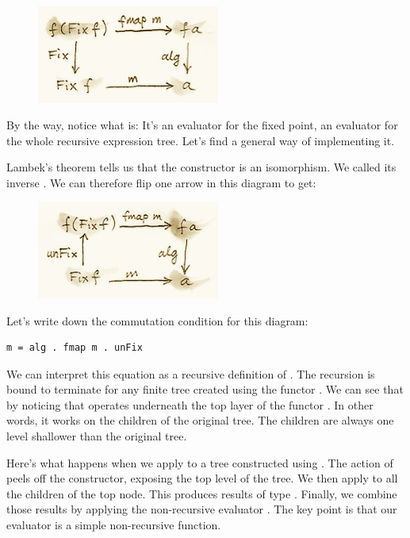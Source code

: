 \begin{figure}[H]
\centering
\includegraphics[width=60mm]{images/alg5.png}
\end{figure}

\noindent
By the way, notice what  is: It's an evaluator for the fixed
point, an evaluator for the whole recursive expression tree. Let's find
a general way of implementing it.

Lambek's theorem tells us that the constructor  is an
isomorphism. We called its inverse . We can therefore flip
one arrow in this diagram to get:

\begin{figure}[H]
\centering
\includegraphics[width=60mm]{images/alg6.png}
\end{figure}

\noindent
Let's write down the commutation condition for this diagram:

\begin{verbatim}
m = alg . fmap m . unFix
\end{verbatim}
We can interpret this equation as a recursive definition of .
The recursion is bound to terminate for any finite tree created using
the functor . We can see that by noticing that
 operates underneath the top layer of the functor
. In other words, it works on the children of the original
tree. The children are always one level shallower than the original
tree.

Here's what happens when we apply  to a tree constructed using
. The action of  peels off the constructor,
exposing the top level of the tree. We then apply  to all the
children of the top node. This produces results of type .
Finally, we combine those results by applying the non-recursive
evaluator . The key point is that our evaluator 
is a simple non-recursive function.

